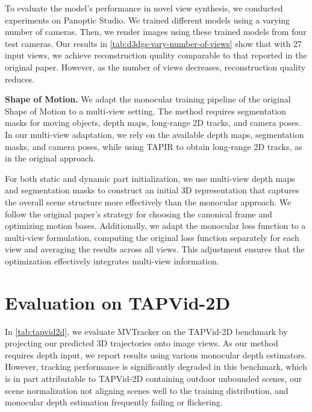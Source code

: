 To evaluate the model's performance in novel view synthesis, we conducted experiments on Panoptic Studio. We trained different models using a varying number of cameras. Then, we render images using these trained models from four test cameras. Our results in \cref{tab:d3dgs-vary-number-of-views} show that with 27 input views, we achieve reconstruction quality comparable to that reported in the original paper. However, as the number of views decreases, reconstruction quality reduces.


\textbf{Shape of Motion.} We adapt the monocular training pipeline of the original Shape of Motion \cite{som2024} to a multi-view setting. The method requires segmentation masks for moving objects, depth maps, long-range 2D tracks, and camera poses. In our multi-view adaptation, we rely on the available depth maps, segmentation masks, and camera poses, while using TAPIR \cite{doersch2023tapir} to obtain long-range 2D tracks, as in the original approach.

For both static and dynamic part initialization, we use multi-view depth maps and segmentation masks to construct an initial 3D representation that captures the overall scene structure more effectively than the monocular approach. We follow the original paper's strategy for choosing the canonical frame and optimizing motion bases. Additionally, we adapt the monocular loss function to a multi-view formulation, computing the original loss function separately for each view and averaging the results across all views. This adjustment ensures that the optimization effectively integrates multi-view information.

\section{Evaluation on TAPVid-2D}
\label{app:tapvid2d}

In \cref{tab:tapvid2d}, we evaluate MVTracker on the TAPVid-2D benchmark by projecting our predicted 3D trajectories onto image views. As our method requires depth input, we report results using various monocular depth estimators. However, tracking performance is significantly degraded in this benchmark, which is in part attributable to TAPVid-2D containing outdoor unbounded scenes, our scene normalization not aligning scenes well to the training distribution, and monocular depth estimation frequently failing or flickering.


